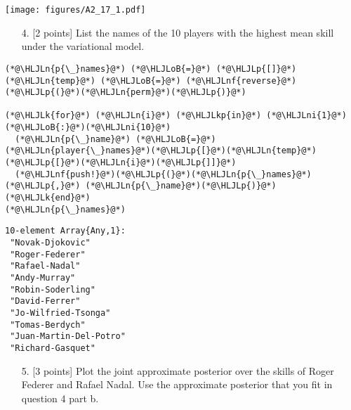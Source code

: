 \documentclass[12pt,a4paper]{article}
\newcommand{\HLJLk}[1]{\textcolor[RGB]{148,91,176}{\textbf{#1}}}
\newcommand{\HLJLkp}[1]{\textcolor[RGB]{148,91,176}{\textbf{#1}}}
\newcommand{\HLJLn}[1]{#1}
\newcommand{\HLJLnf}[1]{\textcolor[RGB]{66,102,213}{#1}}
\newcommand{\HLJLni}[1]{\textcolor[RGB]{59,151,46}{#1}}
\newcommand{\HLJLoB}[1]{\textcolor[RGB]{102,102,102}{\textbf{#1}}}
\newcommand{\HLJLp}[1]{#1}
\begin{document}
\texttt{[image: figures/A2\_17\_1.pdf]}

\begin{itemize}
\item[4. ] [2 points] List the names of the 10 players with the highest mean skill under the variational model.

\end{itemize}

\begin{lstlisting}
(*@\HLJLn{p{\_}names}@*) (*@\HLJLoB{=}@*) (*@\HLJLp{[]}@*)
(*@\HLJLn{temp}@*) (*@\HLJLoB{=}@*) (*@\HLJLnf{reverse}@*)(*@\HLJLp{(}@*)(*@\HLJLn{perm}@*)(*@\HLJLp{)}@*)

(*@\HLJLk{for}@*) (*@\HLJLn{i}@*) (*@\HLJLkp{in}@*) (*@\HLJLni{1}@*)(*@\HLJLoB{:}@*)(*@\HLJLni{10}@*)
  (*@\HLJLn{p{\_}name}@*) (*@\HLJLoB{=}@*) (*@\HLJLn{player{\_}names}@*)(*@\HLJLp{[}@*)(*@\HLJLn{temp}@*)(*@\HLJLp{[}@*)(*@\HLJLn{i}@*)(*@\HLJLp{]]}@*)
  (*@\HLJLnf{push!}@*)(*@\HLJLp{(}@*)(*@\HLJLn{p{\_}names}@*)(*@\HLJLp{,}@*) (*@\HLJLn{p{\_}name}@*)(*@\HLJLp{)}@*)
(*@\HLJLk{end}@*)
(*@\HLJLn{p{\_}names}@*)
\end{lstlisting}

\begin{lstlisting}
10-element Array{Any,1}:
 "Novak-Djokovic"       
 "Roger-Federer"        
 "Rafael-Nadal"         
 "Andy-Murray"          
 "Robin-Soderling"      
 "David-Ferrer"         
 "Jo-Wilfried-Tsonga"   
 "Tomas-Berdych"        
 "Juan-Martin-Del-Potro"
 "Richard-Gasquet"
\end{lstlisting}


\begin{itemize}
\item[5. ] [3 points] Plot the joint approximate posterior over the skills of Roger Federer and Rafael Nadal. Use the approximate posterior that you fit in question 4 part b.

\end{itemize}
\end{document}
